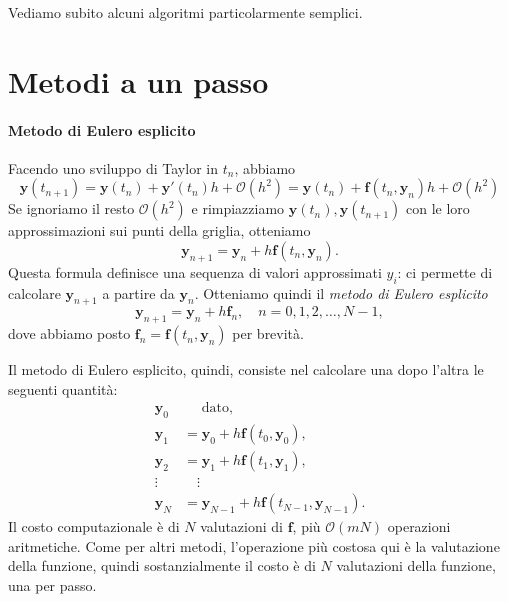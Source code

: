 \documentclass[a4paper]{report}
\theoremstyle{definiton}
\theoremstyle{remark}
\newcommand{\y}{\mathbf{y}}
\newcommand{\f}{\mathbf{f}}
\begin{document}
Vediamo subito alcuni algoritmi particolarmente semplici.

\section{Metodi a un passo}

\paragraph{Metodo di Eulero esplicito}

Facendo uno sviluppo di Taylor in $t_n$, abbiamo
\begin{equation} \label{euleroesp_taylor}
    \y(t_{n+1}) = \y(t_n) + \y'(t_n)h + \mathcal{O}(h^2) = \y(t_n) + \f(t_n, \y_n)h + \mathcal{O}(h^2)
\end{equation}
Se ignoriamo il resto $\mathcal{O}(h^2)$ e rimpiazziamo $\y(t_n), \y(t_{n+1})$ con le loro approssimazioni sui punti della griglia, otteniamo
\[
\y_{n+1} = \y_n + h \f(t_n, \y_n).
\]
Questa formula definisce una sequenza di valori approssimati $y_i$: ci permette di calcolare $\y_{n+1}$ a partire da $\y_n$. Otteniamo quindi il \emph{metodo di Eulero esplicito}
\begin{equation} \label{euleroesplicito}
    \y_{n+1} = \y_n + h \f_n, \quad n = 0,1,2,\dots,N-1,
\end{equation}
dove abbiamo posto $\f_n = \f(t_n, \y_n)$ per brevità.

Il metodo di Eulero esplicito, quindi, consiste nel calcolare una dopo l'altra le seguenti quantità:
\begin{align*}
    \y_0 &\phantom{{}={}} \text{dato},\\
    \y_1 &= \y_0 + h \f(t_0,\y_0),\\
    \y_2 &= \y_1 + h \f(t_1,\y_1),\\
    \vdots& \quad \vdots\\
    \y_N &= \y_{N-1} + h \f(t_{N-1},\y_{N-1}).
\end{align*}
Il costo computazionale è di $N$ valutazioni di $\f$, più $\mathcal{O}(mN)$ operazioni aritmetiche. Come per altri metodi, l'operazione più costosa qui è la valutazione della funzione, quindi sostanzialmente il costo è di $N$ valutazioni della funzione, una per passo.
\end{document}
